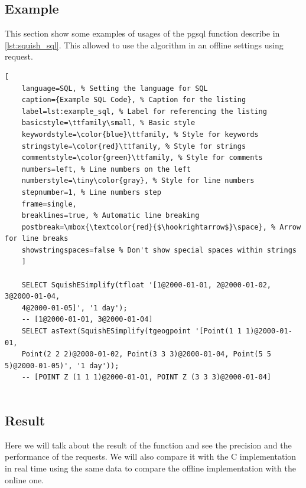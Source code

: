 \documentclass[twoside,12pt, a4paper]{report}
\begin{document}
\subsection{Example}
This section show some examples of usages of the pgsql function describe in \ref{lst:squish_sql}. This allowed to use the algorithm in an offline settings using request. 
\begin{lstlisting}[
	language=SQL, % Setting the language for SQL
	caption={Example SQL Code}, % Caption for the listing
	label=lst:example_sql, % Label for referencing the listing
	basicstyle=\ttfamily\small, % Basic style
	keywordstyle=\color{blue}\ttfamily, % Style for keywords
	stringstyle=\color{red}\ttfamily, % Style for strings
	commentstyle=\color{green}\ttfamily, % Style for comments
	numbers=left, % Line numbers on the left
	numberstyle=\tiny\color{gray}, % Style for line numbers
	stepnumber=1, % Line numbers step
	frame=single,
	breaklines=true, % Automatic line breaking
	postbreak=\mbox{\textcolor{red}{$\hookrightarrow$}\space}, % Arrow for line breaks
	showstringspaces=false % Don't show special spaces within strings
	]
	
	SELECT SquishESimplify(tfloat '[1@2000-01-01, 2@2000-01-02, 3@2000-01-04,
	4@2000-01-05]', '1 day');
	-- [1@2000-01-01, 3@2000-01-04]
	SELECT asText(SquishESimplify(tgeogpoint '[Point(1 1 1)@2000-01-01,
	Point(2 2 2)@2000-01-02, Point(3 3 3)@2000-01-04, Point(5 5 5)@2000-01-05)', '1 day'));
	-- [POINT Z (1 1 1)@2000-01-01, POINT Z (3 3 3)@2000-01-04]
	
\end{lstlisting}

\subsection{Result}

Here we will talk about the result of the function and see the precision and the performance of the requests. We will also compare it with the C implementation in real time using the same data to compare the offline implementation with the online one. 
\end{document}
